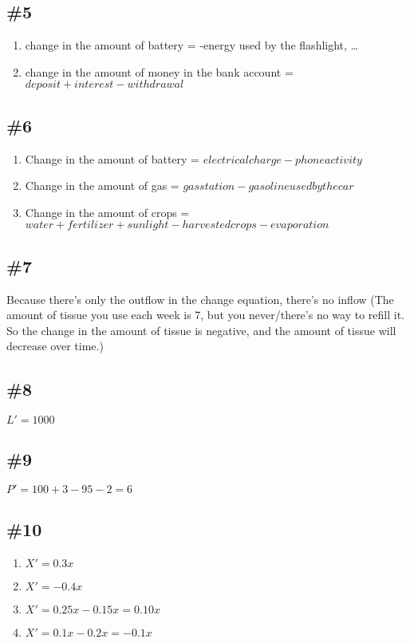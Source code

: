 \documentclass[12pt]{article}
\begin{document}
\subsection*{\#5}
\begin{enumerate}[label=\alph*.]
    \item change in the amount of battery = -energy used by the flashlight, \dots
    \item change in the amount of money in the bank account = $deposit + interest - withdrawal$
\end{enumerate}

\subsection*{\#6}
\begin{enumerate}
    \item Change in the amount of battery = $electrical charge - phone activity$
    \item Change in the amount of gas = $gas station - gasoline used by the car$
    \item Change in the amount of crops = $water + fertilizer + sunlight - harvested crops - evaporation$
\end{enumerate}

\subsection*{\#7}
Because there's only the outflow in the change equation, there's no inflow (The amount of tissue you use each week is 7, but you never/there's no way to refill it. So the change in the amount of tissue is negative, and the amount of tissue will decrease over time.)

\subsection*{\#8}
$L' = 1000$

\subsection*{\#9}
$P' = 100 + 3 - 95 - 2 = 6$

\subsection*{\#10}
\begin{enumerate}[label=\alph*.]
    \item $X' = 0.3x$
    \item $X' = -0.4x$
    \item $X' = 0.25x - 0.15x = 0.10x$
    \item $X' = 0.1x - 0.2x = -0.1x$
\end{enumerate}
\end{document}
